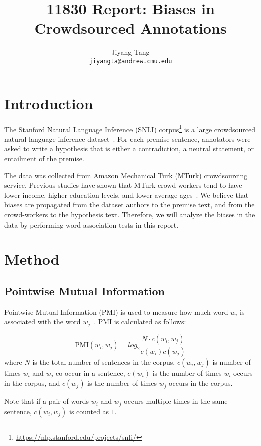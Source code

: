 \documentclass[11pt]{article}
\title{11830 Report: Biases in Crowdsourced Annotations}
\author{
    Jiyang Tang \\
    \texttt{jiyangta@andrew.cmu.edu}
}
\begin{document}
    \maketitle


    \section{Introduction}

    The Stanford Natural Language Inference (SNLI) corpus\footnote{\url{https://nlp.stanford.edu/projects/snli/}} is a
    large crowdsourced natural language inference dataset~\cite{snli}.
    For each premise sentence, annotators were asked to write a hypothesis that is either a contradiction,
    a neutral statement, or entailment of the premise.

    The data was collected from Amazon Mechanical Turk (MTurk) crowdsourcing service.
    Previous studies have shown that MTurk crowd-workers tend to have lower income, higher education levels, and
    lower average ages~\cite{mturks_demography}.
    We believe that biases are propagated from the dataset authors to the premise text, and from the
    crowd-workers to the hypothesis text.
    Therefore, we will analyze the biases in the data by performing word association tests in this report.


    \section{Method}

    \subsection{Pointwise Mutual Information}

    Pointwise Mutual Information (PMI) is used to measure how much word $w_i$ is associated with the word
    $w_j$~\cite{pmi,speech_and_nlp_book}.
    PMI is calculated as follows:

    \[
        \text{PMI}(w_i, w_j) = log_2\frac{N\cdot c(w_i, w_j)}{c(w_i)c(w_j)}
    \]
    where $N$ is the total number of sentences in the corpus,
    $c(w_i,w_j)$ is number of times $w_i$ and $w_j$ co-occur in a sentence,
    $c(w_i)$ is the number of times $w_i$ occurs in the corpus,
    and $c(w_j)$ is the number of times $w_j$ occurs in the corpus.

    Note that if a pair of words $w_i$ and $w_j$ occurs multiple times in the same sentence, $c(w_i,w_j)$ is counted
    as $1$.
\end{document}
